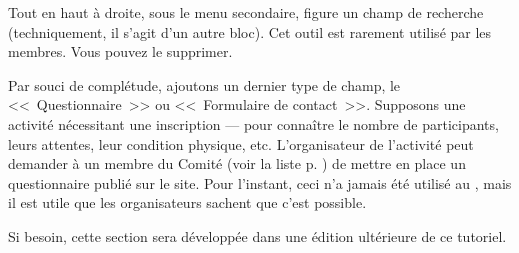 
Tout en haut à droite, sous le menu secondaire, figure un champ de recherche (techniquement, il s’agit d’un autre bloc). Cet outil est rarement utilisé par les membres. Vous pouvez le supprimer.


Par souci de complétude, ajoutons un dernier type de champ, le <<~Questionnaire~>> ou <<~Formulaire de contact~>>. Supposons une activité nécessitant une inscription --- pour connaître le nombre de participants, leurs attentes, leur condition physique, etc. L'organisateur de l'activité peut demander à un membre du Comité (voir la liste p. \pageref{sec:comite}) de mettre en place un questionnaire publié sur le site. Pour l'instant, ceci n'a jamais été utilisé au \CdS, mais il est utile que les organisateurs sachent que c'est possible.

Si besoin, cette section sera développée dans une édition ultérieure de ce tutoriel.
